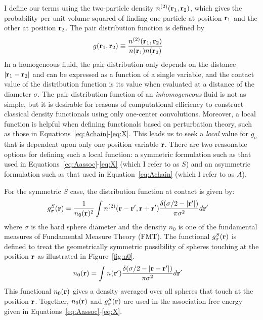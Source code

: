 I define our terms using the two-particle density
$n^{(2)}(\textbf{r}_1,\textbf{r}_2)$, which gives the probability per unit volume
squared of finding one particle at position $\textbf{r}_1$ and the other at
position $\textbf{r}_2$.  The pair distribution function is defined by
\begin{align}
  g(\textbf{r}_1,\textbf{r}_2) &\equiv \frac{n^{(2)}(\textbf{r}_1,\textbf{r}_2)}{n(\textbf{r}_1)n(\textbf{r}_2)}
\end{align}
In a homogeneous fluid, the pair distribution only depends on the
distance $|\textbf{r}_1-\textbf{r}_2|$ and can be expressed as a function of a
single variable, and the contact value of the distribution function is
its value when evaluated at a distance of the diameter $\sigma$.  The
pair distribution function of an \emph{inhomogeneous} fluid is not as
simple, but it is desirable for reasons of computational efficiency to
construct classical density functionals using only one-center
convolutions.  Moreover, a local function is helpful when defining
functionals based on perturbation theory, such as those in
Equations~\ref{eq:Achain}-\ref{eq:X}.  This leads
us to seek a \emph{local} value for $g_\sigma$ that is dependent upon
only one position variable $\textbf{r}$.  There are two reasonable options
for defining such a local function: a symmetric formulation such as
that used in Equations~\ref{eq:Aassoc}-\ref{eq:X} (which I refer to
as $S$) and an asymmetric formulation such as that used in
Equation~\ref{eq:Achain} (which I refer to as $A$).

For the symmetric $S$ case, the distribution function at contact is
given by:
\begin{align}
  g^S_\sigma(\textbf{r}) &= \frac{1}{n_0(\textbf{r})^2}\int n^{(2)}(\textbf{r} - \textbf{r}', \textbf{r}
  + \textbf{r}')
  \frac{\delta(\sigma/2 -|\textbf{r}'|)}{\pi\sigma^2}d\textbf{r}' \label{eq:gS}
\end{align}
where $\sigma$ is the hard sphere diameter and the density $n_0$ is one of
the fundamental measures of Fundamental Measure Theory (FMT).  The
functional $g^S_\sigma(\textbf{r})$ is defined to treat the geometrically
symmetric possibility of spheres touching at the position $\textbf{r}$ as
illustrated in Figure~\ref{fig:n0}.
\begin{align}
  n_0(\textbf{r}) &= \int n(\textbf{r}')\frac{\delta(\sigma/2 -|\textbf{r}-\textbf{r}'|)}{\pi\sigma^2} d\textbf{r}'
  \label{eq:n0}
\end{align}
This functional $n_0(\textbf{r})$ gives a density averaged over all spheres that touch at
the position $\textbf{r}$.  Together, $n_0(\textbf{r})$ and $g_\sigma^S(\textbf{r})$ are
used in the association free energy given in Equations~\ref{eq:Aassoc}-\ref{eq:X}.

